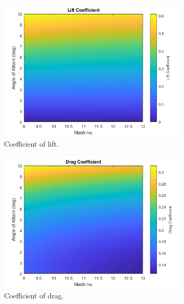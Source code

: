 		
			\begin{figure}[ht]
				\begin{subfigure}{.5\textwidth}
					\centering
					\includegraphics[width=0.99\linewidth]{figures/3_vehicle_design/ThirdStageCl}
					\caption{Coefficient of lift.}
					\label{fig:Cl-ThirdStage}
				\end{subfigure}
				\begin{subfigure}{.5\textwidth}
					\centering
					\includegraphics[width=0.99\linewidth]{figures/3_vehicle_design/ThirdStageCd}
					\caption{Coefficient of drag.}
					\label{fig:Cd-ThirdStage}
				\end{subfigure}
				\begin{subfigure}{.5\textwidth}
					\centering

\end{subfigure}
\end{figure}
